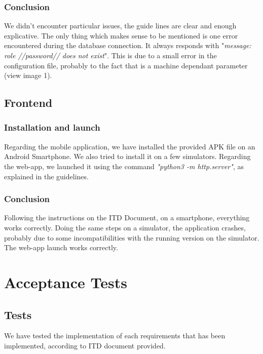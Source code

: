 \documentclass{article}
\begin{document}
\subsubsection{Conclusion}
We didn't encounter particular issues, the guide lines are clear and enough explicative.\newline
The only thing which makes sense to be mentioned is one error encountered during the database connection. It always responds with "\textit{message: role //password// does not exist}". This is due to a small error in the configuration file, probably to the fact that is a machine dependant parameter (view image 1).

\newpage	
\subsection{Frontend}
\subsubsection{Installation and launch}
Regarding the mobile application, we have installed the provided APK file on an Android Smartphone. We also tried to install it on a few simulators.\newline
Regarding the web-app, we launched it using the command \textit{"python3 -m http.server"}, as explained in the guidelines.
\subsubsection{Conclusion}
Following the instructions on the ITD Document, on a smartphone, everything works correctly.
Doing the same steps on a simulator, the application crashes, probably due to some incompatibilities with the running version on the simulator.	\newline
The web-app launch works correctly.

\newpage
\section{Acceptance Tests}
\subsection{Tests}
We have tested the implementation of each requirements that has been implemented, according to ITD document provided.
\end{document}
